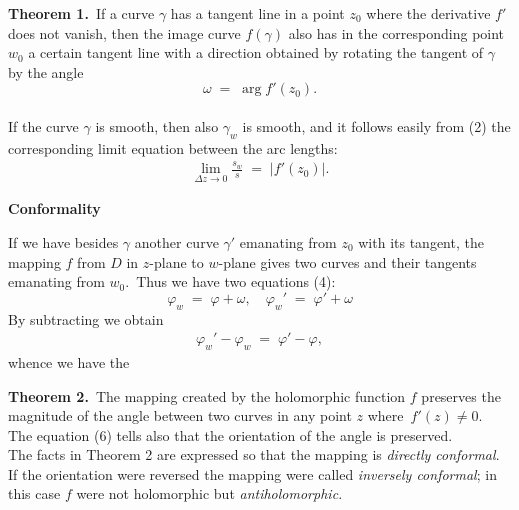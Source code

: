 \documentclass[12pt]{article}
\theoremstyle{definition}
\begin{document}
\textbf{Theorem 1.}\, If a curve $\gamma$ has a tangent line in a point $z_0$ where the derivative $f'$ does not vanish, then the image curve $f(\gamma)$ also has in the corresponding point $w_0$ a certain tangent line with a direction obtained by rotating the tangent of $\gamma$ by the angle
$$\omega \;=\; \arg f'(z_0).$$\\

If the curve $\gamma$ is smooth, then also $\gamma_w$ is smooth, and it follows easily from (2) the corresponding limit equation between the arc lengths:
\begin{align}
\lim_{\Delta z \to 0}\frac{s_w}{s} \;=\; |f'(z_0)|.
\end{align}


\textbf{Conformality}

If we have besides $\gamma$ another curve $\gamma'$ emanating from $z_0$ with its tangent, the mapping $f$ from $D$ in $z$-plane to $w$-plane gives two curves and their tangents emanating from $w_0$.\, Thus we have two equations (4):
$$\varphi_w \;=\; \varphi+\omega, \quad \varphi_w' \;=\; \varphi'+\omega$$
By subtracting we obtain
\begin{align}
\varphi_w'-\varphi_w \;=\; \varphi'-\varphi,
\end{align}
whence we have the

\textbf{Theorem 2.}\, The mapping created by the holomorphic function $f$ preserves the magnitude of the angle between two curves in any point $z$ where\, $f'(z) \neq 0$.\, The equation (6) tells also that the orientation of the angle is preserved.\\

The facts in Theorem 2 are expressed so that the mapping is {\em directly conformal}.\, If the orientation were reversed the mapping were called {\em inversely conformal}; in this case $f$ were not holomorphic but {\em antiholomorphic.}

\end{document}
